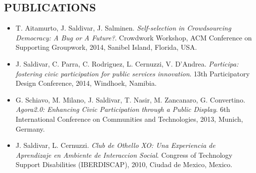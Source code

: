 \documentclass[line,margin]{res}
\begin{document}
\begin{resume}
\section{PUBLICATIONS}
\begin{itemize} \itemsep -2pt 
\item T. Aitamurto, J. Saldivar, J. Salminen. \emph{Self-selection in Crowdsourcing Democracy: A Bug or A Future?}. Crowdwork Workshop, ACM Conference on Supporting Groupwork, 2014, Sanibel Island, Florida, USA.
\item J. Saldivar, C. Parra, C. Rodriguez, L. Cernuzzi, V. D'Andrea. \emph{Participa: fostering civic participation for public services innovation}. 13th Participatory Design Conference, 2014, Windhoek, Namibia.
\item G. Schiavo, M. Milano, J. Saldivar, T. Nasir, M. Zancanaro, G. Convertino. \emph{Agora2.0: Enhancing Civic Participation through a Public Display}. 6th International Conference on Communities and Technologies, 2013, Munich, Germany.
\item J. Saldivar, L. Cernuzzi. \emph{Club de Othello XO: Una Experiencia de Aprendizaje en Ambiente de Interaccion Social}. Congress of Technology Support Disabilities (IBERDISCAP), 2010, Ciudad de Mexico, Mexico.
\end{itemize}

\end{resume}
\end{document}
